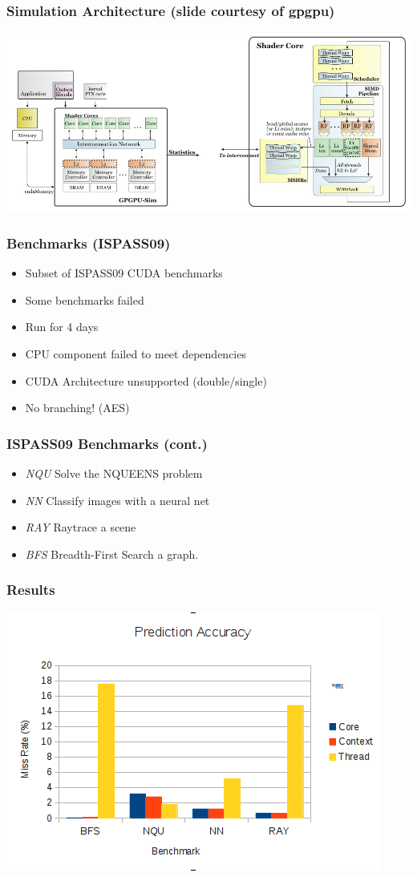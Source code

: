 \documentclass{beamer}
\begin{document}
\begin{frame}
 \frametitle{Simulation Architecture (slide courtesy of gpgpu)}
  \includegraphics[width=.9\textwidth]{uarch.jpg}

\end{frame}

\begin{frame}
 \frametitle{Benchmarks (ISPASS09)}
 \begin{itemize}
  \item Subset of ISPASS09 CUDA benchmarks
  \item Some benchmarks failed
  \item Run for 4 days
  \item CPU component failed to meet dependencies
  \item CUDA Architecture unsupported (double/single)
  \item No branching!  (AES)
 \end{itemize}
\end{frame}

\begin{frame}
 \frametitle{ISPASS09 Benchmarks (cont.)}
\begin{itemize}
 \item \emph{NQU} Solve the NQUEENS problem
 \item \emph{NN} Classify images with a neural net
  \item \emph{RAY} Raytrace a scene
\item \emph{BFS} Breadth-First Search a graph.
\end{itemize}
\end{frame}

\begin{frame}
\frametitle{Results}
\includegraphics[width=.9\textwidth]{data.png}
\end{frame}
\end{document}
